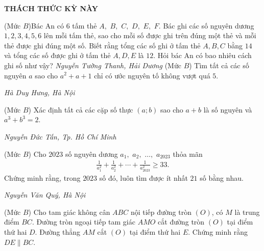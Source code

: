 \begin{center}
	\vspace*{-5pt}
	\textbf{\color{thachthuctoanhoc}\color{thachthuctoanhoc}\color{thachthuctoanhoc}THÁCH THỨC KỲ NÀY}
	\vspace*{-5pt}
\end{center}
\begin{multicols}{2}
	\setlength{\abovedisplayskip}{4pt}
	\setlength{\belowdisplayskip}{4pt}
	{}
	(Mức $B$)Bác An có $6$ tấm thẻ $A,$ $B,$ $C,$ $D,$ $E,$ $F$. Bác ghi các số nguyên dương $1,2,3,4,5,6$ lên mỗi tấm thẻ, sao cho mỗi số được ghi trên đúng một thẻ và mỗi thẻ được ghi đúng một số. Biết rằng tổng các số ghi ở tấm thẻ $A,B,C$ bằng $14$ và tổng các số được ghi ở tấm thẻ $A,D,E$ là $12$. Hỏi bác An có bao nhiêu cách ghi số như vậy?
	\vskip 0.3cm
	\hfill	\textit{Nguyễn Tường Thanh, Hải Dương}
	\vskip 0.3cm
	{}
	(Mức $B$) Tìm tất cả các số nguyên $a$ sao cho $a^2+a+1$ chỉ có ước nguyên tố không vượt quá $5$. 
	\begin{flushright}
		\textit{Hà Duy Hưng, Hà Nội}
	\end{flushright}
	{}
	(Mức $B$) Xác định tất cả các cặp số thực $(a;b)$ sao cho $a+b$ là số nguyên và $a^3+b^3=2$. 
	\begin{flushright}
		\textit{Nguyễn Đức Tấn, Tp. Hồ Chí Minh}
	\end{flushright}
	{}
	(Mức $B$) Cho $2023$ số nguyên dương $a_1,$ $a_2,$ $\ldots,$ $a_{2023}$ thỏa mãn
	\begin{align*}
		\frac{1}{a_1^2}+\frac{1}{a_2^2}+\cdots+\frac{1}{a_{2023}^2}\ge 33.
	\end{align*}
	Chứng minh rằng, trong $2023$ số đó, luôn tìm được ít nhất $21$ số bằng nhau.  
	\begin{flushright}
		\textit{Nguyễn Văn Quý, Hà Nội}
	\end{flushright}
	{}
	(Mức $B$) Cho tam giác không cân $ABC$ nội tiếp đường tròn $(O)$, có $M$ là trung điểm $BC$. Đường tròn ngoại tiếp tam giác $AMO$ cắt đường tròn $(O)$ tại điểm thứ hai $D$. Đường thẳng $AM$ cắt $(O)$  tại điểm thứ hai $E$. Chứng minh rằng $DE\| BC$. 
	\begin{center}

\end{center}
\end{multicols}
